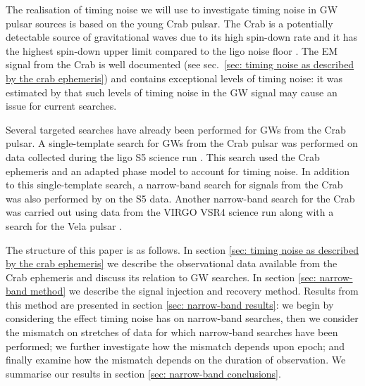 \documentclass[../full_thesis/full_thesis.tex]{subfiles}
\begin{document}
The realisation of timing noise we will use to investigate timing noise
in GW pulsar sources is based on the young Crab pulsar. The Crab is a
potentially detectable  source of gravitational waves due to its high spin-down
rate and it has the highest spin-down upper limit compared to the ligo noise
floor \citep{ligo2008}. The EM signal from the Crab is well documented (see
        sec.~\ref{sec: timing noise as described by the crab ephemeris}) and contains
exceptional levels of timing noise: it was estimated by \citet{Jones2004} that
such levels of timing noise in the GW signal may cause an issue for current
searches.

Several targeted searches have already
been performed for GWs from the Crab pulsar.
A single-template search for GWs from the Crab pulsar was performed on data
collected during the ligo S5 science run \citep{ligo2008}.  This search used
the Crab ephemeris and an adapted phase model to account for timing noise.  In
addition to this single-template search, a narrow-band search for signals from
the Crab was also performed by \citet{ligo2008} on the S5 data. Another
narrow-band search for the Crab was carried out using data from the VIRGO
VSR4 science run along with a search for the Vela pulsar \citep{ligo2015}.

The structure of this paper is as follows. In section \ref{sec: timing noise as
described by the crab ephemeris} we describe the observational data available
from the Crab ephemeris and discuss its relation to GW searches. In section
\ref{sec: narrow-band method} we describe the signal injection and recovery
method.  Results from this method are presented in section \ref{sec:
narrow-band results}: we begin by considering the effect timing noise has on
narrow-band searches, then we consider the mismatch on stretches of data for
which narrow-band searches have been performed; we further investigate how the
mismatch depends upon epoch; and finally examine how the mismatch depends on
the duration of observation. We summarise our results in section \ref{sec:
narrow-band conclusions}.
\end{document}
